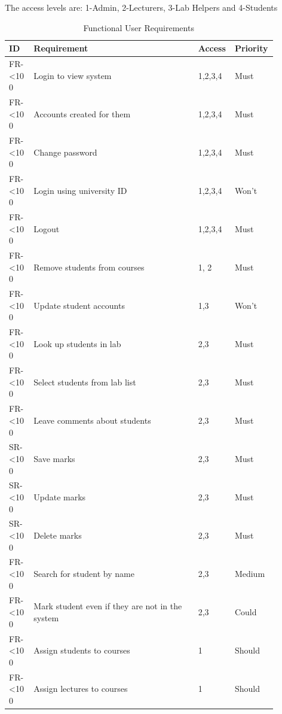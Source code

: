 \documentclass[12pt]{article}  %
\newcommand{\rid}[1]{\centering #1-\ifnum\value{requirement}<10 0\fi\arabic{requirement} \stepcounter{requirement}}
\begin{document}
The access levels are: 1-Admin, 2-Lecturers, 3-Lab Helpers and 4-Students

\begin{spacing}{1.5}
\begin{longtable}{|p{0.09\linewidth}|p{0.6\linewidth}|p{0.1\linewidth}|
p{0.1\linewidth}|}
\caption{Functional User Requirements} \label{table:funct-user} \\ \hline
\textbf{ID} & \textbf{Requirement} & \textbf{Access} & \textbf{Priority}\\
\hline \hline

\rowcolor{Gray} \rid{FR} & Login to view system & 1,2,3,4 & Must\\ \hline
\rid{FR} &  Accounts created for them & 1,2,3,4 & Must\\ \hline
\rid{FR} &  Change password & 1,2,3,4 & Must\\ \hline
\rid{FR} &  Login using university ID & 1,2,3,4 & Won't\\ \hline
\rid{FR} &  Logout & 1,2,3,4 & Must \\ \hline

\rid{FR} &  Remove students from courses & 1, 2 & Must\\ \hline
\rid{FR} &  Update student accounts & 1,3 & Won't \\ \hline

\rid{FR} &  Look up students in lab & 2,3 & Must\\ \hline
\rid{FR} &  Select students from lab list & 2,3 & Must\\ \hline
\rid{FR} &  Leave comments about students & 2,3 & Must\\ \hline
\rid{SR} &  Save marks & 2,3 & Must\\ \hline
\rid{SR} &  Update marks & 2,3 & Must\\ \hline
\rid{SR} &  Delete marks & 2,3 & Must\\ \hline
\rid{FR} &  Search for student by name & 2,3 & Medium\\ \hline
\rid{FR} &  Mark student even if they are not in the system & 2,3 & Could \\ \hline

\rid{FR} &  Assign students to courses & 1 & Should\\ \hline
\rid{FR} &  Assign lectures to courses & 1 & Should\\ \hline


\end{longtable}
\end{spacing}
\end{document}
